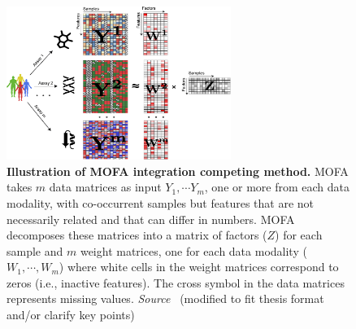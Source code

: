 \begin{description}
    \begin{figure}[!ht]
    	\centering
    	\includegraphics[width=0.65\textwidth]{Alg_MOFA/fig}
    	\vspace{0.1cm}
    	\caption[Illustration of MOFA integration competing method.]{\textbf{Illustration of MOFA integration competing method.} MOFA takes $m$ data matrices as input $Y_1, \cdots Y_m$, one or more from each data modality, with co-occurrent samples but features that are not necessarily related and that can differ in numbers. MOFA decomposes these matrices into a matrix of factors ($Z$) for each sample and $m$ weight matrices, one for each data modality ($W_1,\cdots, W_m$) where white cells in the weight matrices correspond to zeros (i.e., inactive features). The cross symbol in the data matrices represents missing values. \emph{Source~\cite{tewari2017mofa}} (modified to fit thesis format and/or clarify key points)
    }
    	\label{fig:Alg_MOFA}
    \end{figure}


\end{description}
